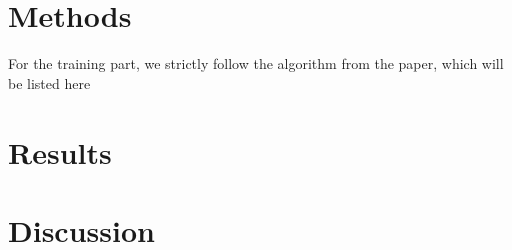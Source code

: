 \documentclass[twoside]{article}
\begin{document}
\begin{multicols}{2}
\section{Methods}
For the training part, we strictly follow the algorithm from the paper, which will be listed here

\section{Results}

\section{Discussion}


\begin{thebibliography}{2} %

%
%

\end{thebibliography}


\end{multicols}
\end{document}
